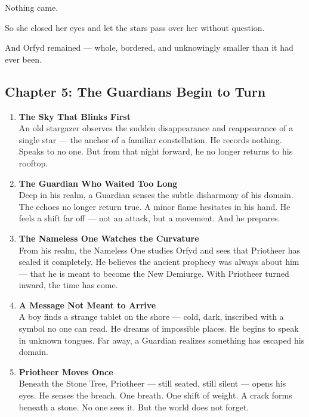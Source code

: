 \documentclass[9pt]{article}
\begin{document}
Nothing came.

So she closed her eyes and let the stars pass over her without question.

And Orfyd remained — whole, bordered, and unknowingly smaller than it had ever been.

\newpage

\subsection*{Chapter 5: The Guardians Begin to Turn}

\vspace{1in}

\begin{enumerate}
    \item \textbf{The Sky That Blinks First} \\
    An old stargazer observes the sudden disappearance and reappearance of a single star — the anchor of a familiar constellation. He records nothing. Speaks to no one. But from that night forward, he no longer returns to his rooftop.

    \vspace{1em}
    \item \textbf{The Guardian Who Waited Too Long} \\
    Deep in his realm, a Guardian senses the subtle disharmony of his domain. The echoes no longer return true. A minor flame hesitates in his hand. He feels a shift far off — not an attack, but a movement. And he prepares.

    \vspace{1em}
    \item \textbf{The Nameless One Watches the Curvature} \\
    From his realm, the Nameless One studies Orfyd and sees that Priotheer has sealed it completely. He believes the ancient prophecy was always about him — that he is meant to become the New Demiurge. With Priotheer turned inward, the time has come.

    \vspace{1em}
    \item \textbf{A Message Not Meant to Arrive} \\
    A boy finds a strange tablet on the shore — cold, dark, inscribed with a symbol no one can read. He dreams of impossible places. He begins to speak in unknown tongues. Far away, a Guardian realizes something has escaped his domain.

    \vspace{1em}
    \item \textbf{Priotheer Moves Once} \\
    Beneath the Stone Tree, Priotheer — still seated, still silent — opens his eyes. He senses the breach. One breath. One shift of weight. A crack forms beneath a stone. No one sees it. But the world does not forget.


\end{enumerate}
\end{document}
